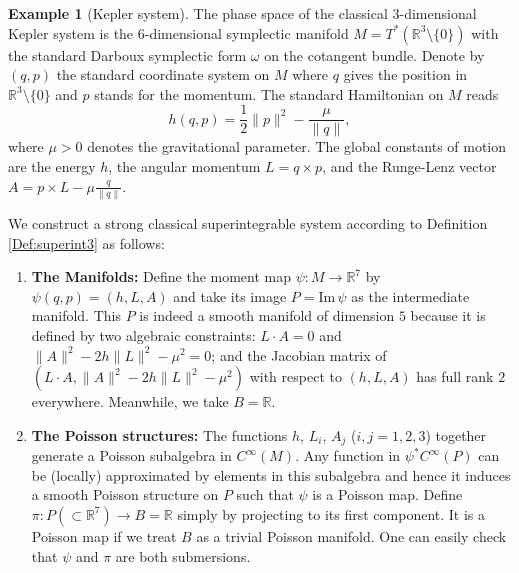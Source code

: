 \documentclass[12pt]{amsart}
\theoremstyle{definition}
\newtheorem{example}[theorem]{Example}
\numberwithin{equation}{section}
\def\Im{\mathrm{Im}\,}
\newcommand{\Cinf}{C^\infty}
\begin{document}
\begin{example}[Kepler system]\label{Ex:Kepler} 
	The phase space of the classical $3$-dimensional Kepler system is the $6$-dimensional symplectic manifold $M = T^*(\mathbb{R}^3 \setminus \{0\})$ with the standard Darboux symplectic form $\omega$ on the cotangent bundle. Denote by $(q,p)$ the standard coordinate system  on $M$ where $q  $ gives the position in $\mathbb{R}^3 \setminus \{0\}$ and $p $ stands for the momentum. The standard Hamiltonian on $M$ reads $$h(q,p) = \frac{1}{2}\|p\|^2 - \frac{\mu}{\|q\|} ,$$ where $\mu>0$ denotes the gravitational parameter. The global constants of motion are the energy $h$, the angular momentum ${L} = {q} \times {p}$, and the Runge-Lenz vector ${A} = {p} \times {L} - \mu \frac{{q}}{\|{q}\|}$. 
		
	We construct a  strong classical superintegrable system according to Definition \ref{Def:superint3} as follows:
	\begin{enumerate}
		\item \textbf{The Manifolds:} Define the moment map $\psi: M \to \mathbb{R}^7$ by $\psi(q,p) = (h, {L}, {A})$ and take its image $P=\Im \psi$ as the intermediate   manifold. This $P$ is indeed a smooth manifold of dimension $5$ because it is defined by   two algebraic constraints:
		$ {L} \cdot {A} = 0$ and $  \|{A}\|^2 - 2h\|{L}\|^2 - \mu^2 = 0$;
		and the Jacobian matrix of $({L} \cdot {A}, \|{A}\|^2 - 2h\|{L}\|^2 - \mu^2)$ with respect to $(h, {L}, {A})$ has  full rank $2$ everywhere.
		Meanwhile, we   take $B  = \mathbb{R}$.
			
		\item \textbf{The Poisson structures:} The functions $h$, $L_i$, $A_j$ ($i,j=1,2,3$) together generate a   Poisson subalgebra in $\Cinf(M)$. Any function in $\psi^*\Cinf(P)$ can be (locally) approximated by elements in this subalgebra and hence it induces  a smooth Poisson structure on $P$ such that $\psi$ is a   Poisson map.  
		Define $\pi: P (\subset \mathbb{R}^7)\to B=\mathbb{R}$ simply by projecting to its first component. It is   a Poisson map if we treat $B$ as  a trivial Poisson manifold. One can easily check that $\psi$ and $\pi$ are both submersions.


			
			

\end{enumerate}
\end{example}
\end{document}
